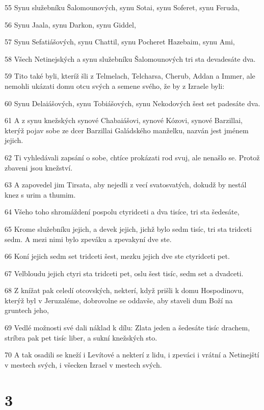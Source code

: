 \par 55 Synu služebníku Šalomounových, synu Sotai, synu Soferet, synu Feruda,
\par 56 Synu Jaala, synu Darkon, synu Giddel,
\par 57 Synu Sefatiášových, synu Chattil, synu Pocheret Hazebaim, synu Ami,
\par 58 Všech Netinejských a synu služebníku Šalomounových tri sta devadesáte dva.
\par 59 Tito také byli, kteríž šli z Telmelach, Telcharsa, Cherub, Addan a Immer, ale nemohli ukázati domu otcu svých a semene svého, že by z Izraele byli:
\par 60 Synu Delaiášových, synu Tobiášových, synu Nekodových šest set padesáte dva.
\par 61 A z synu knežských synové Chabaiášovi, synové Kózovi, synové Barzillai, kterýž pojav sobe ze dcer Barzillai Galádského manželku, nazván jest jménem jejich.
\par 62 Ti vyhledávali zapsání o sobe, chtíce prokázati rod svuj, ale nenašlo se. Protož zbaveni jsou knežství.
\par 63 A zapovedel jim Tirsata, aby nejedli z vecí svatosvatých, dokudž by nestál knez s urim a thumim.
\par 64 Všeho toho shromáždení pospolu ctyridceti a dva tisíce, tri sta šedesáte,
\par 65 Krome služebníku jejich, a devek jejich, jichž bylo sedm tisíc, tri sta tridceti sedm. A mezi nimi bylo zpeváku a zpevakyní dve ste.
\par 66 Koní jejich sedm set tridceti šest, mezku jejich dve ste ctyridceti pet.
\par 67 Velbloudu jejich ctyri sta tridceti pet, oslu šest tisíc, sedm set a dvadceti.
\par 68 Z knížat pak celedí otcovských, nekterí, když prišli k domu Hospodinovu, kterýž byl v Jeruzaléme, dobrovolne se oddavše, aby staveli dum Boží na gruntech jeho,
\par 69 Vedlé možnosti své dali náklad k dílu: Zlata jeden a šedesáte tisíc drachem, stríbra pak pet tisíc liber, a sukní knežských sto.
\par 70 A tak osadili se kneží i Levítové a nekterí z lidu, i zpeváci i vrátní a Netinejští v mestech svých, i všecken Izrael v mestech svých.

\chapter{3}

